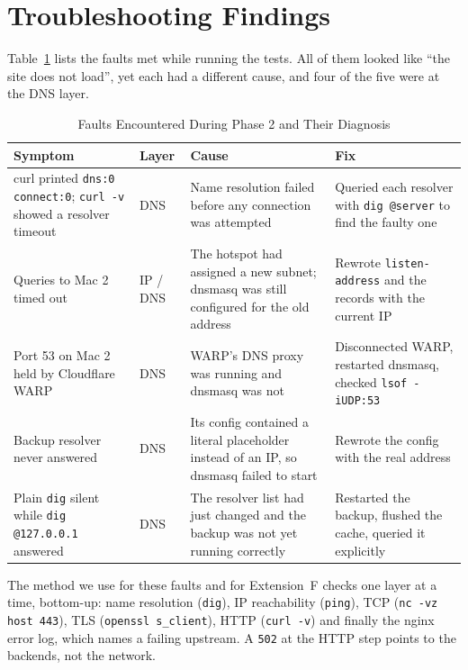 \documentclass[conference]{IEEEtran}
\newcommand{\cmd}[1]{\texttt{#1}}
\begin{document}
\section{Troubleshooting Findings}\label{sec:trouble}
Table~\ref{tab:faults} lists the faults met while running the tests. All of them looked like ``the site does not load'', yet each had a different cause, and four of the five were at the DNS layer.

\begin{table}[htbp]
\caption{Faults Encountered During Phase 2 and Their Diagnosis}
\label{tab:faults}
\centering
\begin{tabular}{@{}>{\raggedright}p{4.2cm} l >{\raggedright}p{5.6cm} >{\raggedright\arraybackslash}p{4.6cm}@{}}
\toprule
Symptom & Layer & Cause & Fix \\
\midrule
curl printed \cmd{dns:0 connect:0}; \cmd{curl -v} showed a resolver timeout & DNS & Name resolution failed before any connection was attempted & Queried each resolver with \cmd{dig @server} to find the faulty one \\
Queries to Mac 2 timed out & IP / DNS & The hotspot had assigned a new subnet; dnsmasq was still configured for the old address & Rewrote \cmd{listen-address} and the records with the current IP \\
Port 53 on Mac 2 held by Cloudflare WARP & DNS & WARP's DNS proxy was running and dnsmasq was not & Disconnected WARP, restarted dnsmasq, checked \cmd{lsof -iUDP:53} \\
Backup resolver never answered & DNS & Its config contained a literal placeholder instead of an IP, so dnsmasq failed to start & Rewrote the config with the real address \\
Plain \cmd{dig} silent while \cmd{dig @127.0.0.1} answered & DNS & The resolver list had just changed and the backup was not yet running correctly & Restarted the backup, flushed the cache, queried it explicitly \\
\bottomrule
\end{tabular}
\end{table}

The method we use for these faults and for Extension~F checks one layer at a time, bottom-up: name resolution (\cmd{dig}), IP reachability (\cmd{ping}), TCP (\cmd{nc -vz host 443}), TLS (\cmd{openssl s\_client}), HTTP (\cmd{curl -v}) and finally the nginx error log, which names a failing upstream. A \cmd{502} at the HTTP step points to the backends, not the network.
\end{document}
